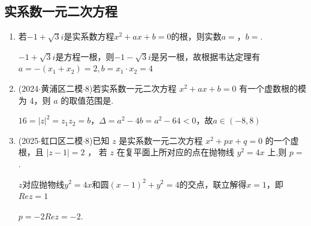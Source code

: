\subsection*{实系数一元二次方程}
\begin{enumerate}
    \item 若$-1+\sqrt{3}i$是实系数方程$x^2+ax+b=0$的根，则实数$a = $，$b = $.
    \begin{jieda}
        $-1+\sqrt{3}i$是方程一根，则$-1-\sqrt{3}i$是另一根，故根据韦达定理有$a = -(x_1 + x_2) = 2, b = x_1 \cdot x_2 = 4$
    \end{jieda}
    \item (2024$\cdot$黄浦区二模$\cdot$8)若实系数一元二次方程 ${x}^{2} + {ax} + b = 0$ 有一个虚数根的模为 4，则 $a$ 的取值范围是.
    \begin{jieda}
        $16 = \left|z\right|^2 = z_1z_2 = b$，$\Delta = a^2 - 4b = a^2 - 64 < 0$，故$a \in (-8, 8)$
    \end{jieda}
    \item (2025$\cdot$虹口区二模$\cdot$8)已知 $z$ 是实系数一元二次方程 ${x}^{2} + {px} + q = 0$ 的一个虚根，且 $\left| {z - 1}\right|  = 2$ ， 若 $z$ 在复平面上所对应的点在抛物线 ${y}^{2} = {4x}$ 上,则 $p =$ .
    \begin{jieda}
        $z$对应抛物线$y^2 = 4x$和圆$(x-1)^2+y^2 = 4$的交点，联立解得$x = 1$，即$Rez = 1$
        
        $p = -2Rez = -2$.
    \end{jieda}
\end{enumerate}